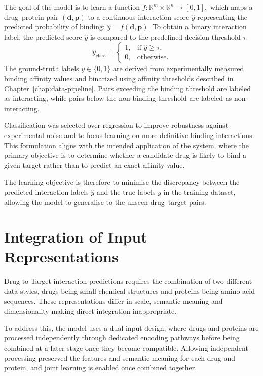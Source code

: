 The goal of the model is to learn a function $f: \mathbb{R}^{m} \times \mathbb{R}^{n} \rightarrow [0,1],$ which maps a drug--protein pair $(\mathbf{d}, \mathbf{p})$ to a continuous interaction score $\hat{y}$ representing the predicted probability of binding:
$\hat{y} = f(\mathbf{d}, \mathbf{p}).$
To obtain a binary interaction label, the predicted score $\hat{y}$ is compared to the predefined decision threshold $\tau$:
\[
\hat{y}_{\text{class}} =
\begin{cases}
1, & \text{if } \hat{y} \ge \tau, \\
0, & \text{otherwise}.
\end{cases}
\]
The ground-truth labels $y \in \{0,1\}$ are derived from experimentally measured binding affinity values and binarized using affinity thresholds described in Chapter~\ref{chap:data-pipeline}. Pairs exceeding the binding threshold are labeled as interacting, while pairs below the non-binding threshold are labeled as non-interacting.


Classification was selected over regression to improve robustness against experimental noise and to focus learning on more definitive binding interactions. This formulation aligns with the intended application of the system, where the primary objective is to determine whether a candidate drug is likely to bind a given target rather than to predict an exact affinity value.

The learning objective is therefore to minimise the discrepancy between the predicted interaction labels $\hat{y}$ and the true labels $y$ in the training dataset, allowing the model to generalise to the unseen drug–target pairs.

\section{Integration of Input Representations}
Drug to Target interaction predictions requires the combination of two different data styles, drugs being small chemical structures and proteins being amino acid sequences. These representations differ in scale, semantic meaning and dimensionality making direct integration inappropriate. 

To address this, the model uses a dual-input design, where drugs and proteins are processed independently through dedicated encoding pathways before being combined at a later stage once they become compatible. Allowing independent processing preserved the features and semantic meaning for each drug and protein, and joint learning is enabled once combined together.
